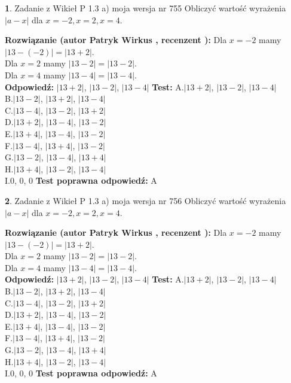 \documentclass[12pt, a4paper]{article}
\theoremstyle{definition} %
\newtheorem{zad}{}
\newcommand{\zadStart}[1]{\begin{zad}#1\newline}
\newcommand{\zadStop}{\end{zad}}
\newcommand{\rozwStart}[2]{\noindent \textbf{Rozwiązanie (autor #1 , recenzent #2): }\newline}
\newcommand{\rozwStop}{\newline}
\newcommand{\odpStart}{\noindent \textbf{Odpowiedź:}\newline}
\newcommand{\odpStop}{\newline}
\newcommand{\testStart}{\noindent \textbf{Test:}\newline}
\newcommand{\testStop}{\newline}
\newcommand{\kluczStart}{\noindent \textbf{Test poprawna odpowiedź:}\newline}
\newcommand{\kluczStop}{\newline}
\begin{document}
\zadStart{Zadanie z Wikieł P 1.3 a) moja wersja nr 755}
Obliczyć wartość wyrażenia $|a - x|$ dla $x=-2,x=2,x=4$.
\zadStop
\rozwStart{Patryk Wirkus}{}
Dla $x = -2$ mamy $|13 - (-2)| = |13 + 2|$.\\
Dla $x = 2$ mamy $|13 - 2| = |13 - 2|$.\\
Dla $x = 4$ mamy $|13 - 4| = |13 - 4|$.\\
\rozwStop
\odpStart
$|13 + 2|$, $|13 - 2|$, $|13 - 4|$
\odpStop
\testStart
A.$|13 + 2|$, $|13 - 2|$, $|13 - 4|$\\
B.$|13 - 2|$, $|13 + 2|$, $|13 - 4|$\\
C.$|13 - 4|$, $|13 - 2|$, $|13 + 2|$\\
D.$|13 + 2|$, $|13 - 4|$, $|13 - 2|$\\
E.$|13 + 4|$, $|13 - 4|$, $|13 - 2|$\\
F.$|13 - 4|$, $|13 + 4|$, $|13 - 2|$\\
G.$|13 - 2|$, $|13 - 4|$, $|13 + 4|$\\
H.$|13 + 4|$, $|13 - 2|$, $|13 - 4|$\\
I.$0$, $0$, $0$
\testStop
\kluczStart
A
\kluczStop



\zadStart{Zadanie z Wikieł P 1.3 a) moja wersja nr 756}
Obliczyć wartość wyrażenia $|a - x|$ dla $x=-2,x=2,x=4$.
\zadStop
\rozwStart{Patryk Wirkus}{}
Dla $x = -2$ mamy $|13 - (-2)| = |13 + 2|$.\\
Dla $x = 2$ mamy $|13 - 2| = |13 - 2|$.\\
Dla $x = 4$ mamy $|13 - 4| = |13 - 4|$.\\
\rozwStop
\odpStart
$|13 + 2|$, $|13 - 2|$, $|13 - 4|$
\odpStop
\testStart
A.$|13 + 2|$, $|13 - 2|$, $|13 - 4|$\\
B.$|13 - 2|$, $|13 + 2|$, $|13 - 4|$\\
C.$|13 - 4|$, $|13 - 2|$, $|13 + 2|$\\
D.$|13 + 2|$, $|13 - 4|$, $|13 - 2|$\\
E.$|13 + 4|$, $|13 - 4|$, $|13 - 2|$\\
F.$|13 - 4|$, $|13 + 4|$, $|13 - 2|$\\
G.$|13 - 2|$, $|13 - 4|$, $|13 + 4|$\\
H.$|13 + 4|$, $|13 - 2|$, $|13 - 4|$\\
I.$0$, $0$, $0$
\testStop
\kluczStart
A
\kluczStop
\end{document}
